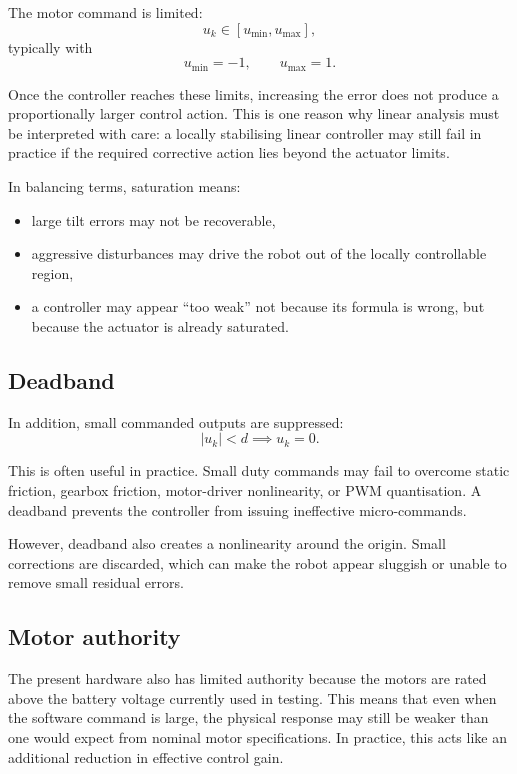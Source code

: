 \documentclass[11pt,a4paper]{article}
\begin{document}
The motor command is limited:
\[
u_k \in [u_{\min},u_{\max}],
\]
typically with
\[
u_{\min} = -1,\qquad u_{\max}=1.
\]

Once the controller reaches these limits, increasing the error does not produce a proportionally larger control action. This is one reason why linear analysis must be interpreted with care: a locally stabilising linear controller may still fail in practice if the required corrective action lies beyond the actuator limits.

In balancing terms, saturation means:
\begin{itemize}
    \item large tilt errors may not be recoverable,
    \item aggressive disturbances may drive the robot out of the locally controllable region,
    \item a controller may appear ``too weak'' not because its formula is wrong, but because the actuator is already saturated.
\end{itemize}

\subsection*{Deadband}

In addition, small commanded outputs are suppressed:
\[
|u_k| < d \implies u_k = 0.
\]

This is often useful in practice. Small duty commands may fail to overcome static friction, gearbox friction, motor-driver nonlinearity, or PWM quantisation. A deadband prevents the controller from issuing ineffective micro-commands.

However, deadband also creates a nonlinearity around the origin. Small corrections are discarded, which can make the robot appear sluggish or unable to remove small residual errors.

\subsection*{Motor authority}

The present hardware also has limited authority because the motors are rated above the battery voltage currently used in testing. This means that even when the software command is large, the physical response may still be weaker than one would expect from nominal motor specifications. In practice, this acts like an additional reduction in effective control gain.

\end{document}
